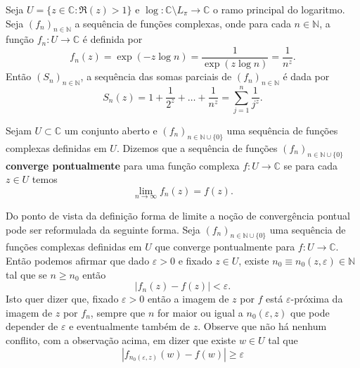 \begin{exemplo}\label{ex-somas-parciais-zeta}
Seja $U=\{z\in\mathbb{C}: \Re(z)>1\}$ e $\log:\mathbb{C}\setminus L_{\pi}\to\mathbb{C}$
o ramo principal do logaritmo.
Seja $(f_n)_{n\in\mathbb{N}}$ a sequência de funções complexas, onde para cada 
$n\in\mathbb{N}$, a função $f_n:U\to\mathbb{C}$ é definida por
\[
f_n(z) = \exp(-z\log n) = \frac{1}{\exp(z\log n)} = \frac{1}{n^z}.
\]
Então $(S_n)_{n\in\mathbb{N}}$, a sequência das somas parciais de $(f_n)_{n\in\mathbb{N}}$ é 
dada por
\[
S_n(z) = 1+\frac{1}{2^z}+\ldots+\frac{1}{n^z} = \sum_{j=1}^n \frac{1}{j^z}.
\]
\end{exemplo}



\begin{definicao}
Sejam $U\subset\mathbb{C}$ um conjunto aberto e $(f_n)_{n\in\mathbb{N}\cup\{0\}}$
uma sequência de funções complexas definidas em $U$. Dizemos que a sequência de
funções $(f_n)_{n\in\mathbb{N}\cup\{0\}}$ \textbf{converge pontualmente} para uma função complexa $f:U\to\mathbb{C}$ se para cada $z\in U$ temos 
\[
\lim_{n\to\infty} f_n(z) = f(z).
\]
\end{definicao}


Do ponto de vista da definição forma de limite a noção de convergência pontual
pode ser reformulada da seguinte forma. 
Seja $(f_n)_{n\in\mathbb{N}\cup\{0\}}$ uma sequência de funções complexas
definidas em $U$ que converge pontualmente para $f:U\to\mathbb{C}$. Então podemos
afirmar que dado $\varepsilon>0$ e fixado $z\in U$, 
existe $n_0\equiv n_0(z,\varepsilon)\in\mathbb{N}$
tal que se $n\geqslant n_0$ então 
\[
|f_n(z)-f(z)|<\varepsilon.
\]
Isto quer dizer que, fixado $\varepsilon>0$ então 
a imagem de $z$ por $f$ está $\varepsilon$-próxima da 
imagem de $z$ por $f_n$, sempre que $n$ for maior ou igual a 
$n_0(\varepsilon,z)$ que pode depender de $\varepsilon$ e eventualmente 
também de $z$.
Observe que não há nenhum conflito, com a observação acima, em dizer que existe 
$w\in U$ tal que 
\[
|f_{n_0(\varepsilon,z)}(w)-f(w)| \geqslant \varepsilon 
\]


